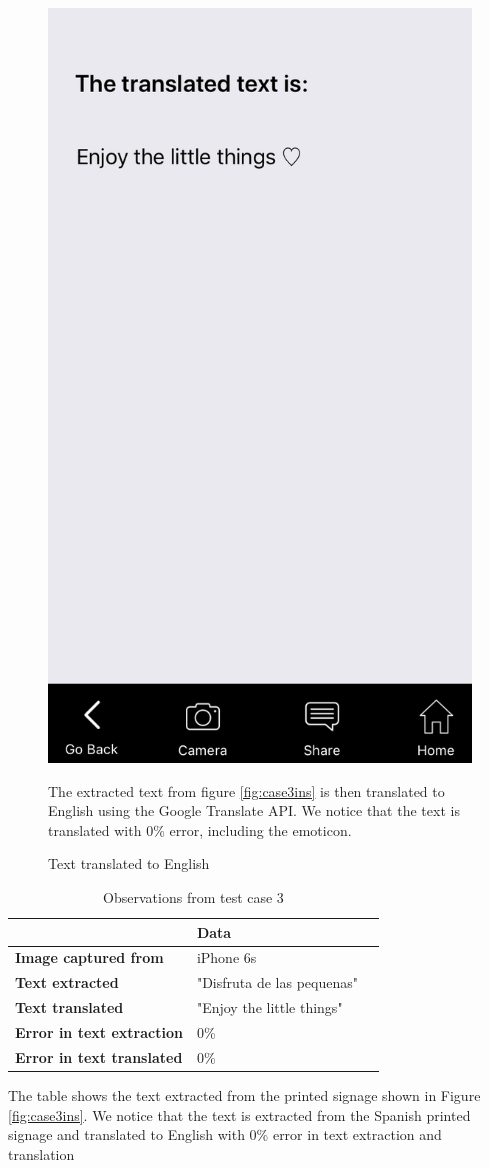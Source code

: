 \documentclass[12pt]{article}
\begin{document}
       \begin{figure}[H]
	\centering
	\includegraphics[width=0.5\linewidth]{media/case3-eng.PNG}
	\caption{Text translated to English}{The extracted text from figure \ref{fig:case3ins} is then translated to English using the Google Translate API. We notice that the text is translated with 0\% error, including the emoticon. }
	\label{fig:eng}
\end{figure} 


\begin{table}%
    \centering
   
    \label{my-label3}
       \begin{tabular}{|p{30mm}|p{55mm}|p{35mm}|}
 \hline
  & \textbf{Data}  \\ [0.5ex] 
 \hline\hline
 \textbf{Image captured from} & iPhone 6s  \\
 \hline
  \textbf{Text extracted} & "Disfruta de las pequenas" \\
 \hline
 \textbf{Text translated} & "Enjoy the little things"   \\
 \hline
 \textbf{Error in text extraction} & 0\%   \\
 \hline
 \textbf{Error in text translated} & 0\%   \\ [1ex] 
 \hline
    \end{tabular}
     \caption{Observations from test case 3} {The table shows the text extracted from the printed signage shown in Figure  \ref{fig:case3ins}. We notice that the text is extracted from the Spanish printed signage and translated to English with 0\% error in text extraction and translation}
\end{table}
\end{document}
